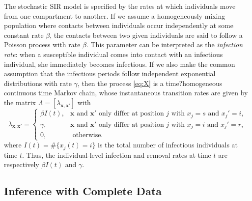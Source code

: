 \documentclass[12pt]{article}
\begin{document}
	The stochastic SIR model is specified by the rates at which individuals move from one compartment to another. If we assume a homogeneously mixing population where contacts between individuals occur independently at some constant rate $\beta$, the contacts between two given individuals are said to follow a Poisson process with rate $\beta$. This parameter can be interpreted as the \textit{infection rate}: when a susceptible individual comes into contact with an infectious individual, she immediately becomes infectious.
	If we also make the common assumption that the infectious periods follow independent exponential distributions with rate $\gamma$, then the process \eqref{eq:X} is a time?homogeneous continuous time Markov chain, whose instantaneous transition rates
	are given by the matrix $\Lambda = [\lambda_{\mathbf{x}, \mathbf{x}'}]$ with
	\begin{equation}
		\label{eq:rate}
		\lambda_{\mathbf{x}, \mathbf{x}'} = 
		\begin{cases}
			\beta I(t), & \mathbf{x} \text{ and } \mathbf{x}' \text{ only differ at position } j \text{ with } x_j = s \text{ and } x_j' = i, \\
			\gamma, & \mathbf{x} \text{ and } \mathbf{x}' \text{ only differ at position } j \text{ with } x_j = i \text{ and } x_j' = r, \\
			0, & \text{ otherwise.}
		\end{cases}
	\end{equation}
	where $I(t) = \#\{x_j(t) = i\}$ is the total number of infectious individuals at time $t$. Thus, the individual-level infection and removal rates at time $t$ are respectively $\beta I(t)$ and $\gamma$.
	
	\subsection{Inference with Complete Data}
	\label{sec:icd}
	
\end{document}
